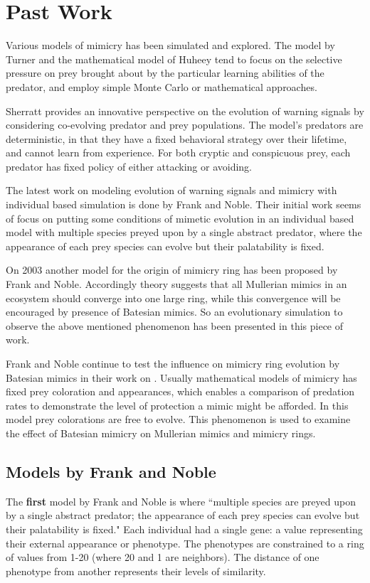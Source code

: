\section{Past Work}
Various models of mimicry has been simulated and explored. The model by Turner \cite{turner1996} and the mathematical model of Huheey \cite{huheey1988} tend to focus on the selective pressure on prey brought about by the particular learning abilities of the predator, and employ simple Monte Carlo or mathematical approaches.

Sherratt \cite{sherratt2002} provides an innovative perspective on the evolution of warning signals by considering co-evolving predator and prey populations. The model's predators are deterministic, in that they have a fixed behavioral strategy over their lifetime, and cannot learn from experience. For both cryptic and conspicuous prey, each predator has fixed policy of either attacking or avoiding.

The latest work on modeling evolution of warning signals and mimicry with individual based simulation is done by Frank and Noble. Their initial work \cite{franks2002} seems of focus on putting some conditions of mimetic evolution in an individual based model with multiple species preyed upon by a single abstract predator, where the appearance of each prey species can evolve but their palatability is fixed.

On 2003 \cite{franks2003} another model for the origin of mimicry ring has been proposed by Frank and Noble. Accordingly theory suggests that all Mullerian mimics in an ecosystem should converge into one large ring, while this convergence will be encouraged by presence of Batesian mimics. So an evolutionary simulation to observe the above mentioned phenomenon has been presented in this piece of work.

Frank and Noble continue to test the influence on mimicry ring evolution by Batesian mimics in their work on \cite{franks2004}. Usually mathematical models of mimicry has fixed prey coloration and appearances, which enables a comparison of predation rates to demonstrate the level of protection a mimic might be afforded. In this model prey colorations are free to evolve. This phenomenon is used to examine the effect of Batesian mimicry on Mullerian mimics and mimicry rings. 

\subsection{Models by Frank and Noble}
\label{subsec:models-by-frank-and-noble}
The \textbf{first} model by Frank and Noble \cite{franks2002} is where ``multiple species are preyed upon by a single abstract predator; the appearance of each prey species can evolve but their palatability is fixed." Each individual had a single gene: a value representing their external appearance or phenotype. The phenotypes are constrained to a ring of values from 1-20 (where 20 and 1 are neighbors). The distance of one phenotype from another represents their levels of similarity. 

